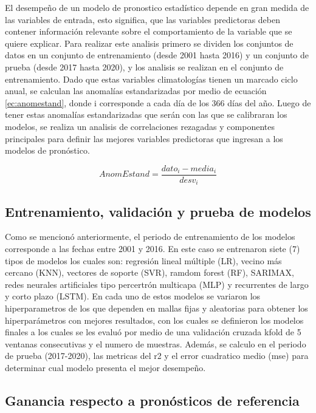 \documentclass[draft]{agujournal2019}
\begin{document}
El desempeño de un modelo de pronostico estadístico depende en gran medida de las variables de entrada, esto significa, que las variables predictoras deben contener información relevante sobre el comportamiento de la variable que se quiere explicar. Para realizar este analisis primero se dividen los conjuntos de datos en un conjunto de entrenamiento (desde 2001 hasta 2016) y un conjunto de prueba (desde 2017 hasta 2020), y los analisis se realizan en el conjunto de entrenamiento. Dado que estas variables climatologías tienen un marcado ciclo anual, se calculan las anomalías estandarizadas por medio de ecuación \ref{ec:anomestand}, donde i corresponde a cada día de los 366 días del año. Luego de tener estas anomalías estandarizadas que serán con las que se calibraran los modelos, se realiza un analisis de correlaciones rezagadas y componentes principales para definir las mejores variables predictoras que ingresan a los modelos de pronóstico.

\begin{equation}
	AnomEstand = \frac{dato_i -media_i}{desv_i}
\label{ec:anomestand}
\end{equation}

\subsection{Entrenamiento, validación y prueba de modelos}

Como se mencionó anteriormente, el periodo de entrenamiento de los modelos corresponde a las fechas entre 2001 y 2016. En este caso se entrenaron siete (7) tipos de modelos los cuales son: regresión lineal múltiple (LR), vecino más cercano (KNN), vectores de soporte (SVR), ramdom forest (RF), SARIMAX, redes neurales artificiales tipo percertrón multicapa (MLP) y recurrentes de largo y corto plazo (LSTM). En cada uno de estos modelos se variaron los hiperparametros de los que dependen en mallas fijas y aleatorias para obtener los hiperparámetros con mejores resultados, con los cuales se definieron los modelos finales a los cuales se les evaluó por medio de una validación cruzada kfold de 5 ventanas consecutivas y el numero de muestras. Además, se calculo en el periodo de prueba (2017-2020), las metricas del r2 y el error cuadratico medio (mse) para determinar cual modelo presenta el mejor desempeño.

\subsection{Ganancia respecto a pronósticos de referencia}
\end{document}
